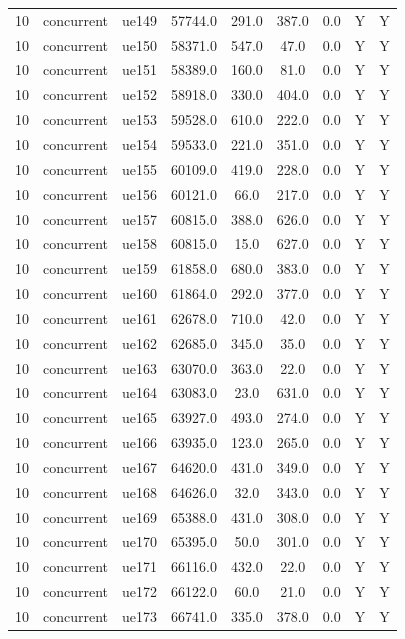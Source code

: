 \begin{table}[ht]
\begin{tabular}{|c|c|c|c|c|c|c|c|c|}
10 & concurrent & ue149 & 57744.0 & 291.0 & 387.0 & 0.0 & Y & Y \\
10 & concurrent & ue150 & 58371.0 & 547.0 & 47.0 & 0.0 & Y & Y \\
10 & concurrent & ue151 & 58389.0 & 160.0 & 81.0 & 0.0 & Y & Y \\
10 & concurrent & ue152 & 58918.0 & 330.0 & 404.0 & 0.0 & Y & Y \\
10 & concurrent & ue153 & 59528.0 & 610.0 & 222.0 & 0.0 & Y & Y \\
10 & concurrent & ue154 & 59533.0 & 221.0 & 351.0 & 0.0 & Y & Y \\
10 & concurrent & ue155 & 60109.0 & 419.0 & 228.0 & 0.0 & Y & Y \\
10 & concurrent & ue156 & 60121.0 & 66.0 & 217.0 & 0.0 & Y & Y \\
10 & concurrent & ue157 & 60815.0 & 388.0 & 626.0 & 0.0 & Y & Y \\
10 & concurrent & ue158 & 60815.0 & 15.0 & 627.0 & 0.0 & Y & Y \\
10 & concurrent & ue159 & 61858.0 & 680.0 & 383.0 & 0.0 & Y & Y \\
10 & concurrent & ue160 & 61864.0 & 292.0 & 377.0 & 0.0 & Y & Y \\
10 & concurrent & ue161 & 62678.0 & 710.0 & 42.0 & 0.0 & Y & Y \\
10 & concurrent & ue162 & 62685.0 & 345.0 & 35.0 & 0.0 & Y & Y \\
10 & concurrent & ue163 & 63070.0 & 363.0 & 22.0 & 0.0 & Y & Y \\
10 & concurrent & ue164 & 63083.0 & 23.0 & 631.0 & 0.0 & Y & Y \\
10 & concurrent & ue165 & 63927.0 & 493.0 & 274.0 & 0.0 & Y & Y \\
10 & concurrent & ue166 & 63935.0 & 123.0 & 265.0 & 0.0 & Y & Y \\
10 & concurrent & ue167 & 64620.0 & 431.0 & 349.0 & 0.0 & Y & Y \\
10 & concurrent & ue168 & 64626.0 & 32.0 & 343.0 & 0.0 & Y & Y \\
10 & concurrent & ue169 & 65388.0 & 431.0 & 308.0 & 0.0 & Y & Y \\
10 & concurrent & ue170 & 65395.0 & 50.0 & 301.0 & 0.0 & Y & Y \\
10 & concurrent & ue171 & 66116.0 & 432.0 & 22.0 & 0.0 & Y & Y \\
10 & concurrent & ue172 & 66122.0 & 60.0 & 21.0 & 0.0 & Y & Y \\
10 & concurrent & ue173 & 66741.0 & 335.0 & 378.0 & 0.0 & Y & Y \\

\end{tabular}
\end{table}
